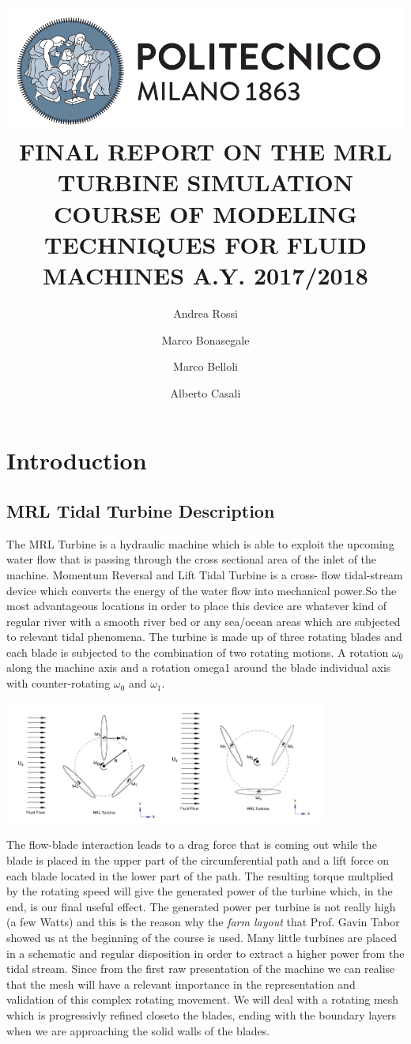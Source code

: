 \documentclass[a4paper,12pt]{article}
\title{
\includegraphics[scale=0.4]{images/logo.png}
\\[1cm]
FINAL REPORT ON THE  MRL TURBINE SIMULATION
COURSE OF MODELING TECHNIQUES FOR FLUID MACHINES 
A.Y. 2017/2018}
\author{
Andrea Rossi \and Marco Bonasegale
\and Marco Belloli \and Alberto Casali 
}
\date{}
\begin{document}
\maketitle

\newpage

\tableofcontents

\newpage

\section{Introduction}

\subsection{MRL Tidal Turbine Description}
The MRL Turbine is a hydraulic machine which is able to exploit the upcoming  water flow that is passing through the cross sectional area of the inlet of the machine. Momentum Reversal and Lift Tidal Turbine is a cross-
flow tidal-stream device which converts
 the energy of the water
flow into mechanical power.So the most advantageous locations in order to place this device are whatever kind of regular river with a smooth river bed or any sea/ocean areas which are subjected to relevant tidal phenomena.
The turbine is made up of three rotating blades and each blade is subjected to the combination of two rotating motions. A rotation $\omega_0$ along the machine axis  and a rotation omega1 around the blade individual axis with counter-rotating $\omega_0$ and $\omega_1$.

\begin{center}
\includegraphics[width=0.8\textwidth]{images/flow.png} 
\end{center}

The flow-blade interaction leads to a drag force that is coming out while the blade is placed in the upper part of the circumferential path and a lift force on each blade located in the lower part of the path.
The resulting torque multplied by the rotating speed will give the generated power of the turbine which, in the end, is our final useful effect. The generated power per turbine is not really high (a few Watts) and this is the reason why the \emph{farm layout}  that Prof. Gavin Tabor showed us at the beginning of the course is used. Many little turbines are placed in a schematic and regular disposition in order to extract a higher power from the tidal stream.
Since from the first raw presentation of the machine we can realise that the mesh will have a relevant importance in the representation and validation of this complex rotating movement. We will deal with a rotating mesh which is progressivly refined closeto the blades, ending with the boundary layers when we are approaching the solid walls of the blades.
\end{document}
